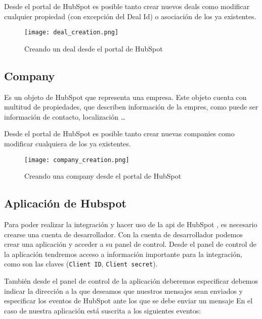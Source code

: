 		Desde el portal de HubSpot es posible tanto crear nuevos deals como modificar cualquier propiedad (con excepción del Deal Id) o asociación de los ya existentes.
		
		\begin{figure}
			\centering
			\texttt{[image: deal\_creation.png]}
			\caption{Creando un deal desde el portal de HubSpot}
		\end{figure}

\subsection{Company}
		
		Es un objeto de HubSpot que representa una empresa. Este objeto cuenta con multitud de propiedades, que describen información de la empres, como puede ser información de contacto, localización \ldots 
		
		Desde el portal de HubSpot es posible tanto crear nuevas companies como modificar cualquiera de los ya existentes.
		
		\begin{figure}
			\centering
			\texttt{[image: company\_creation.png]}
			\caption{Creando una company desde el portal de HubSpot}
		\end{figure}


\subsection{Aplicación de Hubspot}
\label{subsec:app_hs}
Para poder realizar la integración y hacer uso de la \acrshort{api} de HubSpot \cite{hsapi}, es necesario crearse una cuenta de desarrollador. Con la cuenta de desarrollador podemos crear una aplicación y acceder a su panel de control. 
Desde el panel de control de la aplicación tendremos acceso a información importante para la integración, como son las claves (\verb|Client ID|, \verb|Client secret|).


También desde el panel de control de la aplicación deberemos especificar debemos indicar la dirección a la que deseamos que nuestros mensajes sean enviados y especificar los eventos de HubSpot ante los que se debe enviar un mensaje
En el caso de nuestra aplicación está suscrita a los siguientes eventos:

